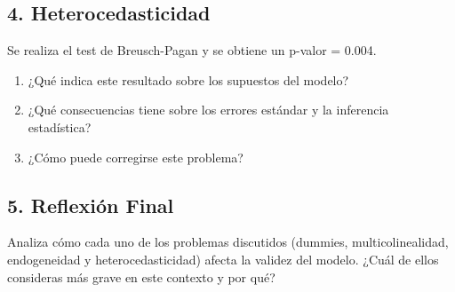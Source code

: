 \documentclass[12pt]{article}
\begin{document}
\subsection*{4. Heterocedasticidad}

Se realiza el test de Breusch-Pagan y se obtiene un p-valor = 0.004.
\begin{enumerate}
  \item[a)] ¿Qué indica este resultado sobre los supuestos del modelo?
  \item[b)] ¿Qué consecuencias tiene sobre los errores estándar y la inferencia estadística?
  \item[c)] ¿Cómo puede corregirse este problema?
\end{enumerate}

\subsection*{5. Reflexión Final}
Analiza cómo cada uno de los problemas discutidos (dummies, multicolinealidad, endogeneidad y heterocedasticidad) afecta la validez del modelo. ¿Cuál de ellos consideras más grave en este contexto y por qué?
\end{document}
